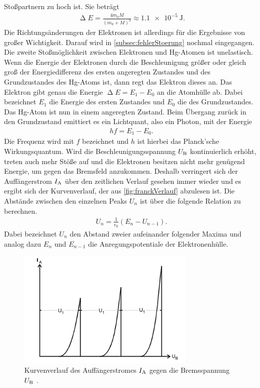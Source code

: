 Stoßpartnern zu hoch ist. Sie beträgt
\begin{align}
    \upDelta E = \frac{4 m_0 M}{(m_0 + M)^2} \approx \SI{1,1 e-5}{\joule}.%
\end{align}
Die Richtungsänderungen der Elektronen ist allerdings für die Ergebnisse von großer Wichtigkeit. Darauf wird in \autoref{subsec:fehlerStoerung} nochmal eingegangen.
Die zweite Stoßmöglichkeit zwischen Elektronen und Hg-Atomen ist unelastisch. Wenn die Energie der Elektronen durch die Beschleunigung größer oder gleich groß der Energiedifferenz des ersten angeregten Zustandes und des Grundzustandes des Hg-Atoms ist, dann regt das Elektron dieses an.
Das Elektron gibt genau die Energie $\upDelta E = E_1 - E_0$ an die Atomhülle ab. Dabei bezeichnet $E_1$ die Energie des ersten Zustandes und $E_0$ die des Grundzustandes.
Das Hg-Atom ist nun in einem angeregten Zustand. Beim Übergang zurück in den Grundzustand emittiert es ein Lichtquant, also ein Photon, mit der Energie
\begin{align*}
    hf = E_1 - E_0.
\end{align*}
Die Frequenz wird mit $f$ bezeichnet und $h$ ist hierbei das Planck'sche Wirkungsquantum.
Wird die Beschleunigungsspannung $U_{\text B}$ kontinuierlich erhöht, treten auch mehr Stöße auf und die Elektronen besitzen nicht mehr genügend Energie, um gegen das Bremsfeld anzukommen.
Deshalb verringert sich der Auffängerstrom $I_{\text A}$ über den zeitlichen Verlauf gesehen immer wieder und es ergibt sich der Kurvenverlauf, der aus \autoref{fig:franckVerlauf} abzulesen ist.
Die Abstände zwischen den einzelnen Peaks $U_n$ ist über die folgende Relation zu berechnen.
\begin{align}
    U_n = \frac{1}{e_0} (E_n - U_{n-1}).
    \label{eqn:abstMaxima}
\end{align}
Dabei bezeichnet $U_n$ den Abstand zweier aufeinander folgender Maxima und analog dazu $E_n$ und $E_{n-1}$ die Anregungspotentiale der Elektronenhülle.

\begin{figure}[H]
    \centering
    \includegraphics[width=0.75\textwidth]{data/VerlaufFH.png}
    \caption{Kurvenverlauf des Auffängerstromes $I_{\text A}$ gegen die Bremsspannung $U_{\text B}$ \cite{Anleitung601}.}
    \label{fig:franckVerlauf}
\end{figure}

